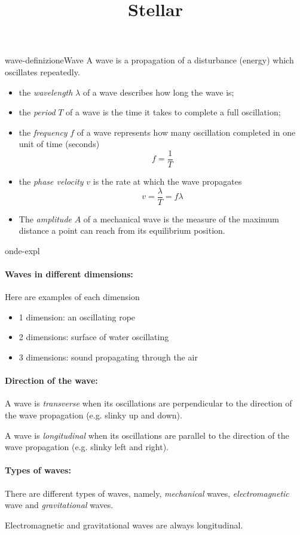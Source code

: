 \documentclass[preview]{standalone}
\begin{document}
\title{Stellar}
\genpage

\begin{snippetdefinition}{wave-definizione}{Wave}
    A wave is a propagation of a disturbance (energy) which oscillates
    repeatedly.
    \begin{itemize}
        \item the \textit{wavelength} \(\lambda\) of a wave describes how long the wave is;
        \item the \textit{period} \(T\) of a wave is the time it takes to complete
            a full oscillation;
        \item the \textit{frequency} \(f\) of a wave represents how many oscillation
        completed in one unit of time (seconds)
        \[
            f = \frac{1}{T}
        \]
        \item the \textit{phase velocity} \(v\) is the rate at which
        the wave propagates
        \[
            v = \frac{\lambda}{T} = f\lambda
        \]
        \item The \textit{amplitude} \(A\) of a mechanical wave is the
        measure of the maximum distance a point can reach
        from its equilibrium position.
    \end{itemize} 
\end{snippetdefinition}

\begin{snippet}{onde-expl}
    \vspace{-0.6cm}
    \paragraph{Waves in different dimensions:}
    Here are examples of each dimension
    \begin{itemize}
        \item 1 dimension: an oscillating rope
        \item 2 dimensions: surface of water oscillating
        \item 3 dimensions: sound propagating through the air
    \end{itemize}

    \paragraph{Direction of the wave:}
    A wave is \textit{transverse} when its oscillations are perpendicular
    to the direction of the wave propagation (e.g. slinky up and down).

    A wave is \textit{longitudinal} when its oscillations are parallel
    to the direction of the wave propagation (e.g. slinky left and right).

    \paragraph{Types of waves:}
    There are different types of waves, namely,
    \textit{mechanical} waves, \textit{electromagnetic} wave
    and \textit{gravitational} waves.

    Electromagnetic and gravitational waves are always longitudinal.
\end{snippet}
\end{document}
